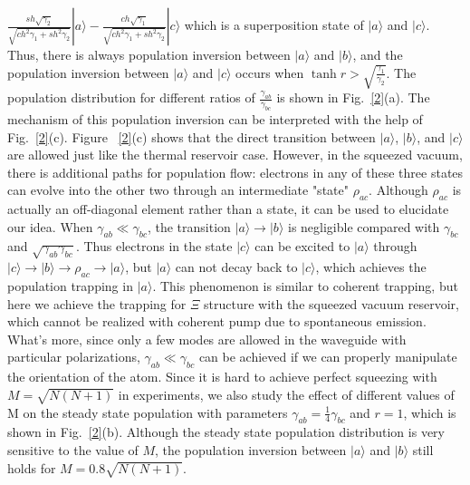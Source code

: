 \documentclass[aps,showpacs,twocolumn,twoside,groupedaddress]{revtex4}
\begin{document}
$\frac{sh\sqrt{\gamma_{2}}}{\sqrt{ch^{2}\gamma_{1}+sh^{2}\gamma_{2}}}|a\rangle-\frac{ch\sqrt{\gamma_{1}}}{\sqrt{ch^{2}\gamma_{1}+sh^{2}\gamma_{2}}}|c\rangle$ which is a superposition state of $|a\rangle$ and $|c\rangle$. Thus, there is always population inversion between $|a\rangle$ and $|b\rangle$, and the population inversion between $|a\rangle$ and $|c\rangle$ occurs when $\tanh r>\sqrt{\frac{\gamma_{1}}{\gamma_{2}}}$. The population distribution for different ratios of $\frac{\gamma_{ab}}{\gamma_{bc}}$ is shown in Fig.~\ref{2}(a). The mechanism of this population inversion can be interpreted with the help of Fig.~\ref{2}(c). Figure ~\ref{2}(c) shows that the direct transition between $|a\rangle$, $|b\rangle$, and $|c\rangle$ are allowed just like the thermal reservoir case. However, in the squeezed vacuum, there is additional paths for population flow: electrons in any of these three states can evolve into the other two through an intermediate "state" $\rho_{ac}$. Although $\rho_{ac}$ is actually an off-diagonal element rather than a state, it can be used to elucidate our idea. When $\gamma_{ab}\ll\gamma_{bc}$, the transition $|a\rangle\rightarrow|b\rangle$ is negligible compared with $\gamma_{bc}$ and $\sqrt{\gamma_{ab}\gamma_{bc}}$. Thus electrons in the state $|c\rangle$ can be excited to $|a\rangle$ through $|c\rangle\rightarrow|b\rangle\rightarrow\rho_{ac}\rightarrow|a\rangle$, but $|a\rangle$ can not decay back to $|c\rangle$, which achieves the population trapping in $|a\rangle$. This phenomenon is similar to coherent trapping, but here we achieve the trapping for $\Xi$ structure with the squeezed vacuum reservoir, which cannot be realized with coherent pump due to spontaneous emission. What's more, since only a few modes are allowed in the waveguide with particular polarizations\cite{You2018},  $\gamma_{ab}\ll\gamma_{bc}$ can be achieved if we can properly manipulate the orientation of the atom. Since it is hard to achieve perfect squeezing with $M=\sqrt{N(N+1)}$ in experiments, we also study the effect of different values of M on the steady state population with parameters $\gamma_{ab}=\frac{1}{4}\gamma_{bc}$ and $r=1$, which is shown in Fig.~\ref{2}(b). Although the steady state population distribution is very sensitive to the value of $M$, the population inversion between $|a\rangle$ and $|b\rangle$ still holds for $M=0.8\sqrt{N(N+1)}$.
\end{document}
